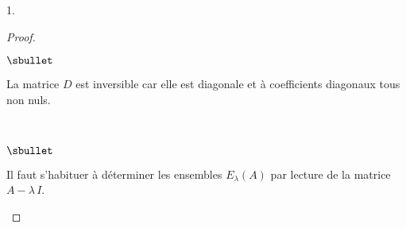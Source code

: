 \documentclass[11pt]{article}%
\begin{document}
\begin{noliste}{1.}
\begin{proof}
\begin{noliste}{$\sbullet$}
    \item La matrice $D$ est inversible car elle est diagonale et à
      coefficients diagonaux tous non nuls.
    \end{noliste}
    ~\\[-1.1cm]
    \begin{remarkL}{.96}%
      \begin{noliste}{$\sbullet$}
      \item Il faut s'habituer à déterminer les ensembles $E_\lambda(A)$
        par lecture de la matrice $A - \lambda \, I$.


\end{noliste}
\end{remarkL}
\end{proof}
\end{noliste}
\end{document}
